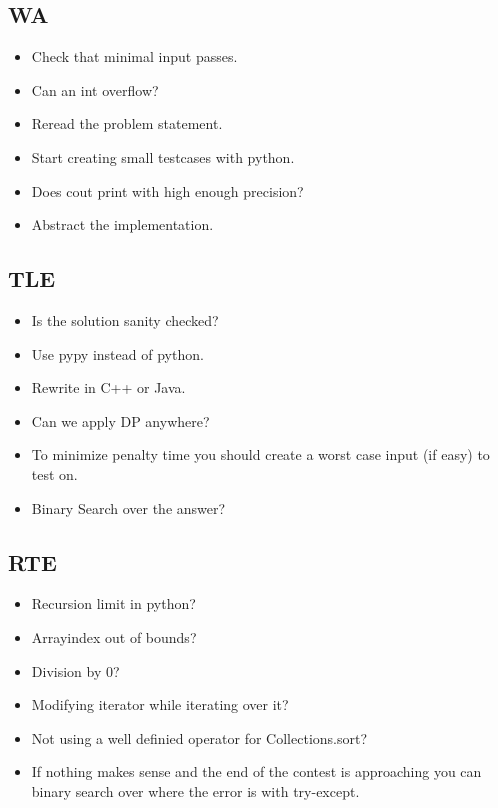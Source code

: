 \documentclass[8pt,a4paper,landscape,oneside]{amsart}
\begin{document}
\begin{multicols*}{2}
\begin{large}
    \subsection{WA}
        \begin{itemize}
        \item Check that minimal input passes.
        \item Can an int overflow?
        \item Reread the problem statement.
        \item Start creating small testcases with python.
        \item Does cout print with high enough precision?
        \item Abstract the implementation.
        \end{itemize}
    \subsection{TLE}
        \begin{itemize}
        \item Is the solution sanity checked?
        \item Use pypy instead of python.
        \item Rewrite in C++ or Java.
        \item Can we apply DP anywhere?
        \item To minimize penalty time you should create a worst case input (if easy) to test on.
        \item Binary Search over the answer?
        \end{itemize}
    \subsection{RTE}
        \begin{itemize}
        \item Recursion limit in python?
        \item Arrayindex out of bounds?
        \item Division by $0$?
        \item Modifying iterator while iterating over it?
        \item Not using a well definied operator for Collections.sort?
        \item If nothing makes sense and the end of the contest is approaching you 
            can binary search over where the error is with try-except.
        \end{itemize}

\end{large}
\end{multicols*}
\end{document}
